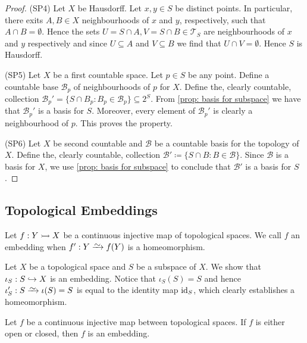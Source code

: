 \begin{proof}
(SP4) Let \(X\) be Hausdorff. Let \(x, y \in S\) be distinct points. In
particular, there exits \(A, B \in X\) neighbourhoods of \(x\) and \(y\),
respectively, such that \(A \cap B = \emptyset\). Hence the sets \(U = S \cap
A, V = S \cap B \in \mathcal T_S\) are neighbourhoods of \(x\) and \(y\)
respectively and since \(U \subseteq A\) and \(V \subseteq B\) we find that
\(U \cap V = \emptyset\). Hence \(S\) is Hausdorff.

(SP5) Let \(X\) be a first countable space. Let \(p \in S\) be any point.
Define a countable base \(\mathcal B_p\) of neighbourhoods of \(p\) for \(X\).
Define the, clearly countable, collection \(\mathcal B_p' = \{S \cap B_p \colon B_p
\in \mathcal B_p\} \subseteq 2^S\). From \cref{prop: basis for subspace} we
have that \(\mathcal B_p'\) is a basis for \(S\). Moreover, every element of
\(\mathcal B_p'\) is clearly a neighbourhood of \(p\). This proves the
property.

(SP6) Let \(X\) be second countable and \(\mathcal B\) be a countable basis
for the topology of \(X\). Define the, clearly countable, collection
\(\mathcal B' \coloneq \{S \cap B \colon B \in \mathcal B\}\). Since \(\mathcal B\) is a
basis for \(X\), we use \cref{prop: basis for subspace} to conclude that
\(\mathcal B'\) is a basis for \(S\).
\end{proof}

\subsection{Topological Embeddings}

\begin{definition}[Embedding]\label{def: topological embedding}
Let \(f: Y \rightarrowtail X\) be a continuous injective map of topological spaces. We
call \(f\) an embedding when \(f': Y \isoto f(Y)\) is a homeomorphism.
\end{definition}

\begin{example}
Let \(X\) be a topological space and \(S\) be a subspace of \(X\). We show
that \(\iota_S: S \hookrightarrow X\) is an embedding. Notice that
\(\iota_S(S) = S\) and hence \(\iota_S': S \isoto \iota(S) = S\) is equal to
the identity map \(\operatorname{id}_S\), which clearly establishes a homeomorphism.
\end{example}

\begin{proposition}
Let \(f\) be a continuous injective map between topological spaces. If \(f\)
is either open or closed, then \(f\) is an embedding.
\end{proposition}

